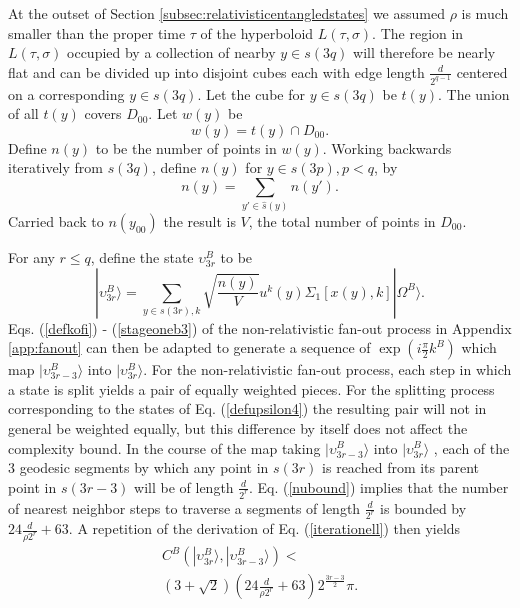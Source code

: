 \documentclass[twocolumn,amsmath,amssymb]{revtex4-1}
\begin{document}
At the outset of Section \ref{subsec:relativisticentangledstates} we assumed $\rho$ is much
smaller than the proper time $\tau$ of the hyperboloid $L( \tau, \sigma)$.
The region in $L( \tau, \sigma)$ occupied by a collection of nearby $y \in s(3q)$ will
therefore be
nearly flat and can
be divided up into disjoint cubes each with edge length $\frac{d}{2^{q-1}}$ centered on a
corresponding $y \in s(3q)$. Let the cube for $y \in s(3q)$ be
$t(y)$. The union of all $t(y)$ covers $D_{00}$. Let $w(y)$ be 
\begin{equation}
  \label{defwy}
  w(y) = t(y) \cap D_{00}.
\end{equation}
Define $n(y)$ to be the number of points in $w(y)$. Working backwards iteratively from $s(3q)$,
define $n(y)$ for $y \in s(3p), p < q$, by
\begin{equation}
  \label{defbarwy}
  n(y) = \sum_{y' \in \hat{s}(y)} n(y').
\end{equation}
Carried back to $n(y_{00})$ the result is $V$, the total
number of points in $D_{00}$.

For any $r \le q$, define the state $\upsilon^B_{3r}$ to be
\begin{equation}
\label{defupsilon4}
|\upsilon^B_{3r} \rangle  = \sum_{y \in s(3r), k}\sqrt{ \frac{n(y)}{V}} u^k(y) \Sigma_1[x( y), k] |\Omega^B \rangle .
\end{equation}
Eqs. (\ref{defkofi}) - (\ref{stageoneb3}) of 
the non-relativistic
fan-out process in Appendix \ref{app:fanout} can then be adapted to
generate a sequence of $\exp( i \frac{\pi}{2} k^B)$ which map 
$|\upsilon^B_{3r-3} \rangle $ into $|\upsilon^B_{3r} \rangle $.
For the non-relativistic fan-out process, each 
step in which a state is split yields 
a pair of equally weighted pieces. For the splitting
process corresponding to the states of Eq. (\ref{defupsilon4}) the
resulting pair will not in general be weighted equally, but
this difference by itself does not affect the complexity bound.
In the course of the map taking $|\upsilon^B_{3r-3} \rangle $ into $|\upsilon^B_{3r} \rangle $ , each of the 3
geodesic segments by which any point in $s(3r)$ is reached
from its parent point in $s(3r - 3)$ will
be of length $\frac{d}{2^r}$. 
Eq. (\ref{nubound}) implies that the number of nearest neighbor
steps to traverse a segments of length $\frac{d}{2^r}$ is
bounded by $ 24 \frac{d}{\rho 2^r} + 63$.
A repetition of the derivation of Eq. (\ref{iterationell}) 
then yields
\begin{multline}
\label{iterationellr}
C^B( |\upsilon^B_{3 r} \rangle , |\upsilon^B_{3 r - 3} \rangle ) < \\ (3+\sqrt{2})( 24 \frac{d}{\rho 2^r} + 63) 2^{\frac{3r-3}{2}} \pi.
\end{multline}
\end{document}
